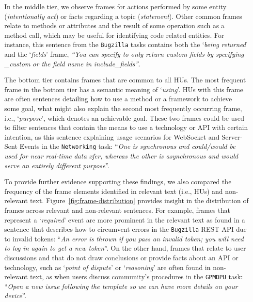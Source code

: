 \afterpage{

}


In the middle tier, we observe frames for actions performed by some entity (\textit{intentionally act}) or facts regarding a topic (\textit{statement}).
Other common frames relate to methods or attributes and the result of some operation such as a method call, which may be useful for identifying code related entities.
For instance, this sentence from the \texttt{Bugzilla} tasks contains both the `\textit{being returned}' and the `\textit{fields}' frame, 
\textit{``You can specify to only return custom fields by specifying \_custom or the field name in include\_fields''}.



The bottom tier contains frames that are common to all HUs.
The most frequent frame in the bottom tier has a semantic meaning of `\textit{using}'.
HUs with this frame are often sentences detailing how to use a method or a
framework to achieve some goal, what might also explain the second most frequently occurring frame, i.e., `\textit{purpose}', which denotes an achievable goal. 
These two frames could be used to filter sentences that contain the means
to use a technology or API with certain intention, as this sentence explaining usage scenarios for
WebSocket and Server-Sent Events in the \texttt{Networking} task:
``\textit{One is synchronous and could/would be used for near real-time data xfer, whereas the other is asynchronous and would serve an entirely different purpose}''.




To provide further evidence supporting these findings,
we also  compared the frequency of the frame elements identified in relevant text (i.e., HUs) and non-relevant text.
Figure~\ref{fig:frame-distribution} provides insight in the distribution of frames across relevant and non-relevant sentences.
For example, frames that represent a `\textit{required}' event
are more prominent in the relevant text
as found in a sentence that describes
how to circumvent errors in the \texttt{Bugzilla} REST API  due to invalid tokens:
``\textit{An error is thrown if you pass an invalid token; you will need to log in again to get a new token}''.
On the other hand, frames that relate to user discussions and that do not draw conclusions or provide 
facts about an API or technology, such as `\textit{point of dispute}' or `\textit{reasoning}' are often found in non-relevant text,
as when users discuss community's procedures in the \texttt{GPMDPU} task: ``\textit{Open a new issue following the template so we can have more details on your device}''. 


